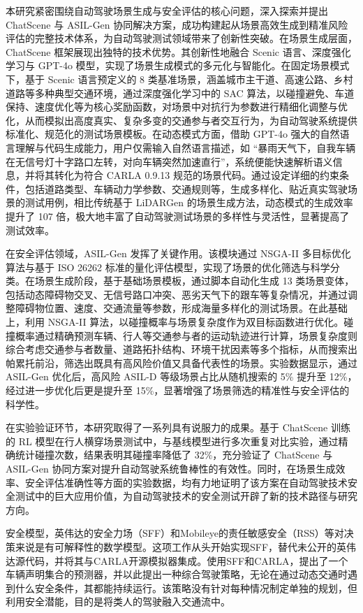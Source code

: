 本研究紧密围绕自动驾驶场景生成与安全评估的核心问题，深入探索并提出 ChatScene 与 ASIL-Gen 协同解决方案，成功构建起从场景高效生成到精准风险评估的完整技术体系，为自动驾驶测试领域带来了创新性突破。​
在场景生成层面，ChatScene 框架展现出独特的技术优势。其创新性地融合 Scenic 语言、深度强化学习与 GPT-4o 模型，实现了场景生成模式的多元化与智能化。在固定场景模式下，基于 Scenic 语言预定义的 8 类基准场景，涵盖城市主干道、高速公路、乡村道路等多种典型交通环境，通过深度强化学习中的 SAC 算法，以碰撞避免、车道保持、速度优化等为核心奖励函数，对场景中对抗行为参数进行精细化调整与优化，从而模拟出高度真实、复杂多变的交通参与者交互行为，为自动驾驶系统提供标准化、规范化的测试场景模板。在动态模式方面，借助 GPT-4o 强大的自然语言理解与代码生成能力，用户仅需输入自然语言描述，如 “暴雨天气下，自我车辆在无信号灯十字路口左转，对向车辆突然加速直行”，系统便能快速解析语义信息，并将其转化为符合 CARLA 0.9.13 规范的场景代码。通过设定详细的约束条件，包括道路类型、车辆动力学参数、交通规则等，生成多样化、贴近真实驾驶场景的测试用例，相比传统基于 LiDARGen 的场景生成方法，动态模式的生成效率提升了 107 倍，极大地丰富了自动驾驶测试场景的多样性与灵活性，显著提高了测试效率。​

在安全评估领域，ASIL-Gen 发挥了关键作用。该模块通过 NSGA-II 多目标优化算法与基于 ISO 26262 标准的量化评估模型，实现了场景的优化筛选与科学分类。在场景生成阶段，基于基础场景模板，通过脚本自动化生成 13 类场景变体，包括动态障碍物交叉、无信号路口冲突、恶劣天气下的跟车等复杂情况，并通过调整障碍物位置、速度、交通流量等参数，形成海量多样化的测试场景。在此基础上，利用 NSGA-II 算法，以碰撞概率与场景复杂度作为双目标函数进行优化。碰撞概率通过精确预测车辆、行人等交通参与者的运动轨迹进行计算，场景复杂度则综合考虑交通参与者数量、道路拓扑结构、环境干扰因素等多个指标，从而搜索出帕累托前沿，筛选出既具有高风险价值又具备代表性的场景。实验数据显示，通过 ASIL-Gen 优化后，高风险 ASIL-D 等级场景占比从随机搜索的 5\% 提升至 12\%，经过进一步优化后更是提升至 15\%，显著增强了场景筛选的精准性与安全评估的科学性。​

在实验验证环节，本研究取得了一系列具有说服力的成果。基于 ChatScene 训练的 RL 模型在行人横穿场景测试中，与基线模型进行多次重复对比实验，通过精确统计碰撞次数，结果表明其碰撞率降低了 32\%，充分验证了 ChatScene 与 ASIL-Gen 协同方案对提升自动驾驶系统鲁棒性的有效性。同时，在场景生成效率、安全评估准确性等方面的实验数据，均有力地证明了该方案在自动驾驶技术安全测试中的巨大应用价值，为自动驾驶技术的安全测试开辟了新的技术路径与研究方向。

安全模型，英伟达的安全力场（SFF）和Mobileye的责任敏感安全（RSS）等对决策来说是有可解释性的数学模型。这项工作从头开始实现SFF，替代未公开的英伟达源代码，并将其与CARLA开源模拟器集成。使用SFF和CARLA，提出了一个车辆声明集合的预测器，并以此提出一种综合驾驶策略，无论在通过动态交通时遇到什么安全条件，其都能持续运行。该策略没有针对每种情况制定单独的规划，但利用安全潜能，目的是将类人的驾驶融入交通流中。



